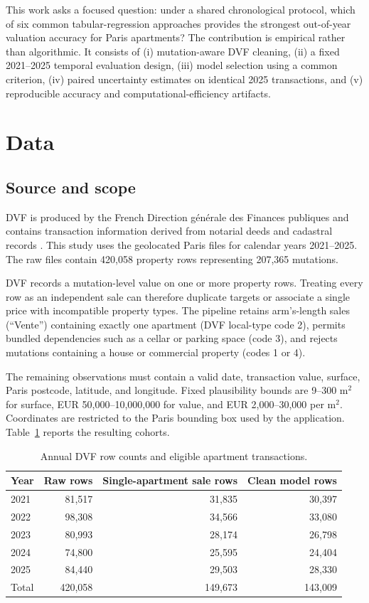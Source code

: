 \documentclass[11pt,a4paper]{article}
\begin{document}
This work asks a focused question: under a shared chronological protocol, which
of six common tabular-regression approaches provides the strongest out-of-year
valuation accuracy for Paris apartments? The contribution is empirical rather
than algorithmic. It consists of (i) mutation-aware DVF cleaning, (ii) a fixed
2021--2025 temporal evaluation design, (iii) model selection using a common
criterion, (iv) paired uncertainty estimates on identical 2025 transactions,
and (v) reproducible accuracy and computational-efficiency artifacts.

\section{Data}

\subsection{Source and scope}

DVF is produced by the French Direction g\'en\'erale des Finances publiques and
contains transaction information derived from notarial deeds and cadastral
records \cite{dvf2026}. This study uses the geolocated Paris files for calendar
years 2021--2025. The raw files contain 420,058 property rows representing
207,365 mutations.

DVF records a mutation-level value on one or more property rows. Treating every
row as an independent sale can therefore duplicate targets or associate a single
price with incompatible property types. The pipeline retains arm's-length sales
(``Vente'') containing exactly one apartment (DVF local-type code 2), permits
bundled dependencies such as a cellar or parking space (code 3), and rejects
mutations containing a house or commercial property (codes 1 or 4).

The remaining observations must contain a valid date, transaction value,
surface, Paris postcode, latitude, and longitude. Fixed plausibility bounds are
9--300 m$^2$ for surface, EUR 50,000--10,000,000 for value, and EUR
2,000--30,000 per m$^2$. Coordinates are restricted to the Paris bounding box
used by the application. Table~\ref{tab:data} reports the resulting cohorts.

\begin{table}[htbp]
\centering
\caption{Annual DVF row counts and eligible apartment transactions.}
\label{tab:data}
\begin{tabular}{lrrr}
\toprule
Year & Raw rows & Single-apartment sale rows & Clean model rows \\
\midrule
2021 & 81,517 & 31,835 & 30,397 \\
2022 & 98,308 & 34,566 & 33,080 \\
2023 & 80,993 & 28,174 & 26,798 \\
2024 & 74,800 & 25,595 & 24,404 \\
2025 & 84,440 & 29,503 & 28,330 \\
\midrule
Total & 420,058 & 149,673 & 143,009 \\
\bottomrule
\end{tabular}
\end{table}
\end{document}
